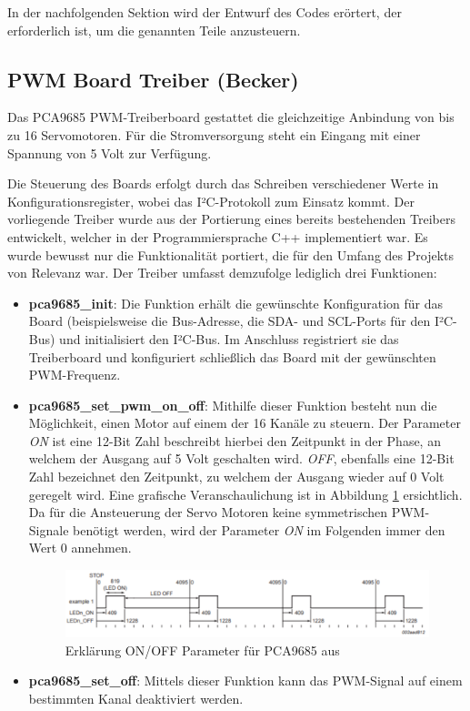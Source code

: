 In der nachfolgenden Sektion wird der Entwurf des Codes erörtert, der erforderlich ist, um die genannten Teile anzusteuern.

\subsection{PWM Board Treiber (Becker)}

Das PCA9685 PWM-Treiberboard gestattet die gleichzeitige Anbindung von bis zu 16 Servomotoren.
Für die Stromversorgung steht ein Eingang mit einer Spannung von 5 Volt zur Verfügung.

Die Steuerung des Boards erfolgt durch das Schreiben verschiedener Werte in Konfigurationsregister, wobei das I²C-Protokoll zum Einsatz kommt. 
Der vorliegende Treiber wurde aus der Portierung eines bereits bestehenden Treibers \cite{esp_pca9685_blueprint} entwickelt, welcher in der Programmiersprache C++ implementiert war. 
Es wurde bewusst nur die Funktionalität portiert, die für den Umfang des Projekts von Relevanz war. 
Der Treiber umfasst demzufolge lediglich drei Funktionen:

\begin{itemize}
    \item \textbf{pca9685\_init}: Die Funktion erhält die gewünschte Konfiguration für das Board (beispielsweise die Bus-Adresse, die SDA- und SCL-Ports für den I²C-Bus) und initialisiert den I²C-Bus. 
    Im Anschluss registriert sie das Treiberboard und konfiguriert schließlich das Board mit der gewünschten PWM-Frequenz.
    \item \textbf{pca9685\_set\_pwm\_on\_off}: Mithilfe dieser Funktion besteht nun die Möglichkeit, einen Motor auf einem der 16 Kanäle zu steuern. 
    Der Parameter \textit{ON} ist eine 12-Bit Zahl beschreibt hierbei den Zeitpunkt in der Phase, an welchem der Ausgang auf 5 Volt geschalten wird. 
    \textit{OFF}, ebenfalls eine 12-Bit Zahl bezeichnet den Zeitpunkt, zu welchem der Ausgang wieder auf 0 Volt geregelt wird. 
    Eine grafische Veranschaulichung ist in Abbildung \ref{fig:esp_pca9685_on_off} ersichtlich. 
    Da für die Ansteuerung der Servo Motoren keine symmetrischen PWM-Signale benötigt werden, wird der Parameter \textit{ON} im Folgenden immer den Wert 0 annehmen.

    \begin{figure}[ht]
        \centering
        \includegraphics[width=\textwidth]{images/becker_esp_pca9685.png}
        \caption{Erklärung ON\slash OFF Parameter für PCA9685 aus \cite[S.~17]{esp_pca9685_datasheet}}
        \label{fig:esp_pca9685_on_off}
    \end{figure}

    \item \textbf{pca9685\_set\_off}: Mittels dieser Funktion kann das PWM-Signal auf einem bestimmten Kanal deaktiviert werden.
\end{itemize}

